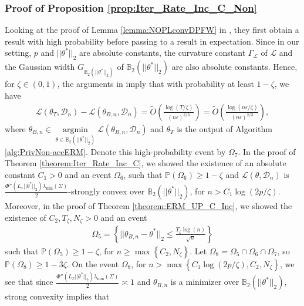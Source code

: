 \documentclass{article}
\begin{document}

\subsubsection{Proof of Proposition \ref{prop:Iter_Rate_Inc_C_Non}}
\label{AppPropIter}

Looking at the proof of Lemma \ref{lemma:NOPLconvDPFW} in \cite{NOPL}, they first obtain a result with high probability before passing to a result in expectation. Since in our setting, $p$ and $||\theta^*||_2$ are absolute constants, the curvature constant $\Gamma_{\mathcal{L}}$ of $\mathcal{L}$ and the Gaussian width $G_{\mathbb{B}_2(||\theta^*||_2)}$ of $\mathbb{B}_2(||\theta^*||_2)$ are also absolute constants. Hence, for $\zeta \in (0, 1)$, the arguments in \cite{NOPL} imply that with probability at least $1 - \zeta$, we have
\begin{align*}
\mathcal{L}(\theta_T, \mathcal{D}_n) - \mathcal{L}(\theta_{B, n}, \mathcal{D}_n) = \widetilde{O}\left(\frac{\log(T/\zeta)}{(n\epsilon)^{2/3}}\right) = \widetilde{O}\left(\frac{\log(n\epsilon/\zeta)}{(n\epsilon)^{2/3}}\right),
\end{align*}
where $\theta_{B, n} \in \mathop{\arg\min}\limits_{\theta \in \mathbb{B}_2(||\theta^*||_2)}\mathcal{L}(\theta_{B, n}, \mathcal{D}_n)$ and $\theta_T$ is the output of Algorithm \ref{alg:PrivNon-accERM}. Denote this high-probability event by $\Omega_7$. In the proof of Theorem \ref{theorem:Iter_Rate_Inc_C}, we showed the existence of an absolute constant $C_1 > 0$ and an event $\Omega_6$, such that $\mathbb{P}(\Omega_6) \geq 1 - \zeta$ and $\mathcal{L}(\theta, \mathcal{D}_n)$ is $\frac{\Phi''(L_x||\theta^*||_2)\lambda_{\min}(\Sigma)}{2}$-strongly convex over $\mathbb{B}_2(||\theta^*||_2)$, for $n > C_1\log(2p/\zeta)$. Moreover, in the proof of Theorem \ref{theorem:ERM_UP_C_Inc}, we showed the existence of $C_2, T_\zeta, N_\zeta > 0$ and an event
\begin{align*}
\Omega_5 = \left\{||\theta_{B, n} - \theta^*||_2 \leq \frac{T_\zeta\log(n)}{\sqrt{n}}\right\}
\end{align*}
such that $\mathbb{P}(\Omega_5) \geq 1 - \zeta$, for $n \geq \max\left\{C_2, N_\zeta\right\}$. Let $\Omega_8 = \Omega_5 \cap \Omega_6 \cap \Omega_7$, so $\mathbb{P}(\Omega_8) \geq 1 - 3\zeta$. On the event $\Omega_8$, for $n > \max\left\{C_1\log(2p/\zeta), C_2, N_\zeta\right\}$, we see that since $\frac{\Phi''(L_x||\theta^*||_2)\lambda_{\min}(\Sigma)}{2} \asymp 1$ and $\theta_{B, n}$ is a minimizer over $\mathbb{B}_2(||\theta^*||_2)$, strong convexity implies that
\end{document}
